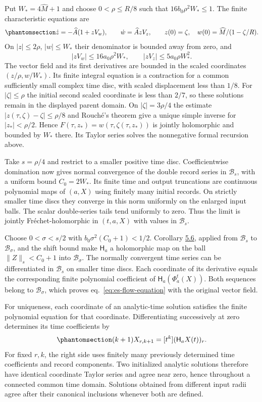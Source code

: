 \documentclass[
  english,
  11pt,
  reqno]{amsart}
\begin{document}
Put \(W_*=4\widehat M+1\) and choose \(0<\rho\le R/8\) such that
\(16b_0\rho^2W_*\le1\). The finite characteristic equations are
\begin{equation}\protect\phantomsection\label{eq:es-characteristics}{
 \dot z=-\widehat A(1+zV_w),\qquad
 \dot w=\widehat A zV_z,\qquad
 z(0)=\zeta,\quad w(0)=\widehat M/(1-\zeta/R).
}\end{equation} On \(|z|\le2\rho\), \(|w|\le W_*\) their denominator is
bounded away from zero, and \[
 |zV_w|\le16a_0\rho^2W_*,\qquad
 |zV_z|\le5a_0\rho W_*^2.
\] The vector field and its first derivatives are bounded in the scaled
coordinates \((z/\rho,w/W_*)\). Its finite integral equation is a
contraction for a common sufficiently small complex time disc, with
scaled displacement less than \(1/8\). For \(|\zeta|\le\rho\) the
initial second scaled coordinate is less than \(2/7\), so these
solutions remain in the displayed parent domain. On \(|\zeta|=3\rho/4\)
the estimate \(|z(\tau,\zeta)-\zeta|\le\rho/8\) and Rouché's theorem
give a unique simple inverse for \(|z_*|<\rho/2\). Hence
\(F(\tau,z_*)=w(\tau,\zeta(\tau,z_*))\) is jointly holomorphic and
bounded by \(W_*\) there. Its Taylor series solves the nonnegative
formal recursion above.

Take \(s=\rho/4\) and restrict to a smaller positive time disc.
Coefficientwise domination now gives normal convergence of the double
record series in \(\mathcal B_s\), with a uniform bound \(C_0=2W_*\).
Its finite time and output truncations are continuous polynomial maps of
\((a,X)\) using finitely many initial records. On strictly smaller time
discs they converge in this norm uniformly on the enlarged input balls.
The scalar double-series tails tend uniformly to zero. Thus the limit is
jointly Fréchet-holomorphic in \((t,a,X)\) with values in
\(\mathcal B_s\).

Choose \(0<\sigma<s/2\) with \(b_0\sigma^2(C_0+1)<1/2\). Corollary
\hyperref[cor:es-nonlinear-field]{5.6}, applied from \(\mathcal B_s\) to
\(\mathcal B_\sigma\), and the shift bound make \(\mathsf H_a\) a
holomorphic map on the ball \(\|Z\|_s<C_0+1\) into
\(\mathcal B_\sigma\). The normally convergent time series can be
differentiated in \(\mathcal B_s\) on smaller time discs. Each
coordinate of its derivative equals the corresponding finite polynomial
coefficient of \(\mathsf H_a(\Phi_a^t(X))\). Both sequences belong to
\(\mathcal B_\sigma\), which proves eq.~\ref{eq:es-flow-equation} with
the original vector field.

For uniqueness, each coordinate of an analytic-time solution satisfies
the finite polynomial equation for that coordinate. Differentiating
successively at zero determines its time coefficients by
\begin{equation}\protect\phantomsection\label{eq:es-flow-time-recursion}{
 (k+1)X_{r,k+1}=[t^k](\mathsf H_aX(t))_r.
}\end{equation} For fixed \(r,k\), the right side uses finitely many
previously determined time coefficients and record components. Two
initialized analytic solutions therefore have identical coordinate
Taylor series and agree near zero, hence throughout a connected common
time domain. Solutions obtained from different input radii agree after
their canonical inclusions whenever both are defined.
\end{document}

